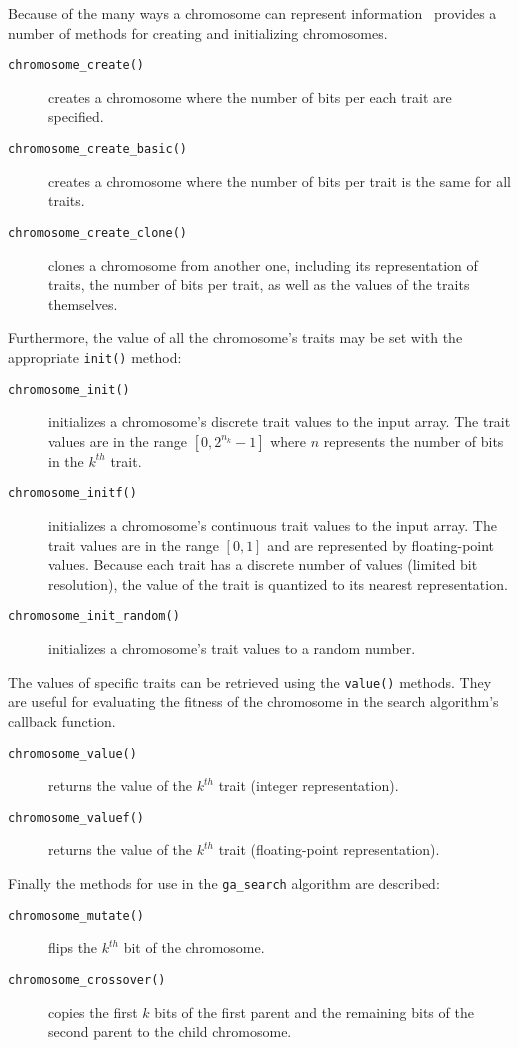 Because of the many ways a chromosome can represent information \liquid\
provides a number of methods for creating and initializing chromosomes.
%
\begin{description}
\item[{\tt chromosome\_create()}]
    creates a chromosome where the number of bits per each trait are
    specified.
\item[{\tt chromosome\_create\_basic()}]
    creates a chromosome where the number of bits per trait is the same
    for all traits.
\item[{\tt chromosome\_create\_clone()}]
    clones a chromosome from another one, including its representation
    of traits, the number of bits per trait, as well as the values of
    the traits themselves.
\end{description}
%
Furthermore, the value of all the chromosome's traits may be set with
the appropriate {\tt init()} method:
%
\begin{description}
\item[{\tt chromosome\_init()}]
    initializes a chromosome's discrete trait values to the input array.
    The trait values are in the range $[0,2^{n_k}-1]$ where $n$
    represents the number of bits in the $k^{th}$ trait.
\item[{\tt chromosome\_initf()}]
    initializes a chromosome's continuous trait values to the input
    array.
    The trait values are in the range $[0,1]$ and are represented by
    floating-point values.
    Because each trait has a discrete number of values (limited bit
    resolution), the value of the trait is quantized to its nearest
    representation.
\item[{\tt chromosome\_init\_random()}]
    initializes a chromosome's trait values to a random number.
\end{description}
%
The values of specific traits can be retrieved using the {\tt value()}
methods.
They are useful for evaluating the fitness of the chromosome in the
search algorithm's callback function.
%
\begin{description}
\item[{\tt chromosome\_value()}]
    returns the value of the $k^{th}$ trait (integer representation).
\item[{\tt chromosome\_valuef()}]
    returns the value of the $k^{th}$ trait (floating-point representation).
\end{description}
%
Finally the methods for use in the {\tt ga\_search} algorithm are
described:
%
\begin{description}
\item[{\tt chromosome\_mutate()}]
    flips the $k^{th}$ bit of the chromosome.
\item[{\tt chromosome\_crossover()}]
    copies the first $k$ bits of the first parent and the remaining bits
    of the second parent to the child chromosome.
\end{description}
%

